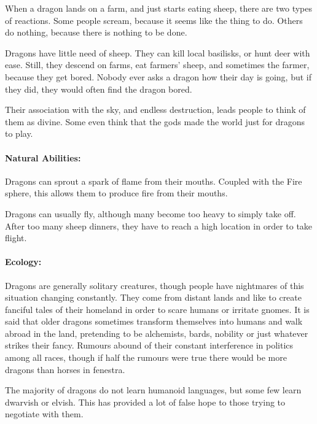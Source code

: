 \begin{multicols}{2}


\noindent
When a dragon lands on a farm, and just starts eating sheep, there are two types of reactions.
Some people scream, because it seems like the thing to do.
Others do nothing, because there is nothing to be done.

Dragons have little need of sheep.
They can kill local basilisks, or hunt deer with ease.
Still, they descend on farms, eat farmers' sheep, and sometimes the farmer, because they get bored.
Nobody ever asks a dragon how their day is going, but if they did, they would often find the dragon bored.

Their association with the sky, and endless destruction, leads people to think of them as divine.
Some even think that the gods made the world just for dragons to play.

\paragraph{Natural Abilities:}
Dragons can sprout a spark of flame from their mouths.
Coupled with the Fire sphere, this allows them to produce fire from their mouths.

Dragons can usually fly, although many become too heavy to simply take off.
After too many sheep dinners, they have to reach a high location in order to take flight.

\paragraph{Ecology:} Dragons are generally solitary creatures, though people have nightmares of this situation changing constantly.
They come from distant lands and like to create fanciful tales of their homeland in order to scare humans or irritate gnomes.
It is said that older dragons sometimes transform themselves into humans and walk abroad in the land, pretending to be alchemists, bards, nobility or just whatever strikes their fancy.
Rumours abound of their constant interference in politics among all races, though if half the rumours were true there would be more dragons than horses in \gls{fenestra}.

The majority of dragons do not learn humanoid languages, but some few learn dwarvish or elvish.
This has provided a lot of false hope to those trying to negotiate with them.

\dragon


\end{multicols}
